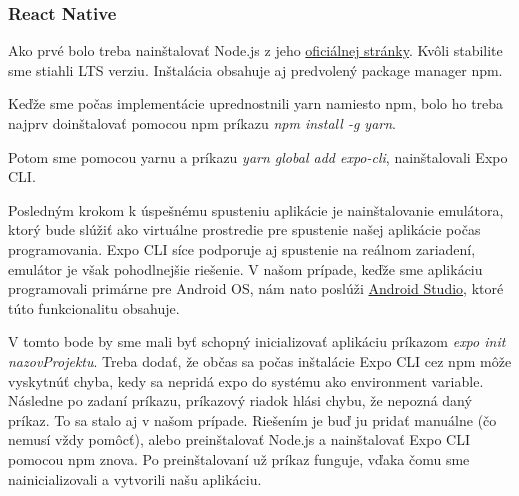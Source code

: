 \subsubsection{React Native}
\begin{itemize}
{\item Ako prvé bolo treba nainštalovať Node.js z jeho \href{https://nodejs.org/en/download/}{oficiálnej stránky}. Kvôli stabilite sme stiahli LTS verziu. Inštalácia obsahuje aj predvolený package manager npm.} 
{\item Keďže sme počas implementácie uprednostnili yarn namiesto npm, bolo ho treba najprv doinštalovať pomocou npm príkazu \textit{npm install -g yarn}.} 
{\item Potom sme pomocou yarnu a príkazu \textit{yarn global add expo-cli}, nainštalovali Expo CLI.} 
{\item Posledným krokom k úspešnému spusteniu aplikácie je nainštalovanie emulátora, ktorý bude slúžiť ako virtuálne prostredie pre spustenie našej aplikácie počas programovania. Expo CLI síce podporuje aj spustenie na reálnom zariadení, emulátor je však pohodlnejšie riešenie. V našom prípade, keďže sme aplikáciu programovali primárne pre Android OS, nám nato poslúži \href{https://developer.android.com/studio}{Android Studio}, ktoré túto funkcionalitu obsahuje.}
\end{itemize}

V tomto bode by sme mali byť schopný inicializovať aplikáciu príkazom \textit{expo init nazovProjektu}.
Treba dodať, že občas sa počas inštalácie Expo CLI cez npm môže vyskytnúť chyba, kedy sa nepridá expo do systému ako environment variable. Následne po zadaní príkazu, príkazový riadok hlási chybu, že nepozná daný príkaz. To sa stalo aj v našom prípade. Riešením je buď ju pridať manuálne (čo nemusí vždy pomôcť), alebo preinštalovať Node.js a nainštalovať Expo CLI pomocou npm znova. Po preinštalovaní už príkaz funguje, vďaka čomu sme nainicializovali a vytvorili našu aplikáciu. 


